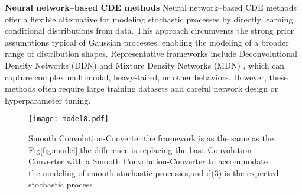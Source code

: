 \noindent \textbf{Neural network–based CDE methods}   Neural network–based CDE methods offer a flexible alternative for modeling stochastic processes by directly learning conditional distributions from data. This approach circumvents the strong prior assumptions typical of Gaussian processes, enabling the modeling of a broader range of distribution shapes. Representative frameworks include Deconvolutional Density Networks (DDN) \cite{chen2022deconvolutional} and Mixture Density Networks (MDN) \cite{bishop1994mixture}, which can capture complex multimodal, heavy-tailed, or other behaviors. However, these methods often require large training datasets and careful network design or hyperparameter tuning.
\begin{figure*}[htbp]
  \centering
  \texttt{[image: model8.pdf]}
  \caption{Smooth Convolution-Converter:the framework is as the same as the Fig\ref{fig:model},the difference is replacing the base Convolution-Converter with a Smooth Convolution-Converter to accommodate the modeling of smooth stochastic processes,and d(3) is the expected stochastic process}
  
  \label{fig:Deconv}
\end{figure*}
